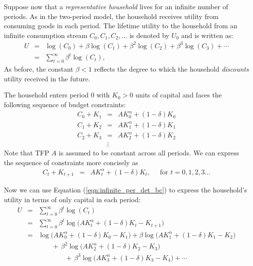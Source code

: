 \documentclass[12pt,fleqn]{article}
\newcommand{\EE}{\begin{eqnarray}}
\newcommand{\FF}{\end{eqnarray}}
\begin{document}
Suppose now that a \emph{representative household} lives for an infinite number of periods. As in the two-period model, the household receives utility from consuming goods in each period. The lifetime utility to the household from an infinite consumption stream $C_0, C_1, C_2, \ldots$ is denoted by $U_0$ and is written as:
	\EE
	U & = & \log (C_0) + \beta  \log (C_1) + \beta^2 \log (C_2)  + \beta^3 \log (C_3)+ \cdots\\
	& = & \sum_{t = 0}^{\infty} \beta^t \log (C_t),  \label{eqn:infinite_per_det_utility}
	\FF
As before, the constant $\beta<1$ reflects the degree to which the household \emph{discounts} utility received in the future.
	
The household enters period 0 with $K_0>0$ units of capital and faces the following sequence of budget constraints:
\EE
C_0 + K_1 & = & A K_0^{\alpha}  + (1-\delta)K_0 \\
C_1 + K_2 & = & A K_1^{\alpha}  + (1-\delta)K_1 \\
C_2 + K_3 & = & A K_2^{\alpha}  + (1-\delta)K_2 \\
& \vdots & 
\FF
Note that TFP $A$ is assumed to be constant across all periods. We can express the sequence of constraints more concisely as 
\EE
C_t + K_{t+1} & = & A K_{t}^{\alpha}  + (1-\delta)K_t, \; \; \; \; \; \text{for } t = 0,1,2,3\ldots \label{eqn:infinite_per_det_bc}
\FF

Now we can use Equation (\ref{eqn:infinite_per_det_bc}) to express the household's utility in terms of only capital in each period:
	\EE
	U 	& = & \sum_{t = 0}^{\infty} \beta^t \log (C_t) \\
		& = & \sum_{t = 0}^{\infty} \beta^t \log \Big(A K_{t}^{\alpha}  + (1-\delta)K_t - K_{t+1}\Big) \\
		& = & \log \Big(A K_{0}^{\alpha}  + (1-\delta)K_0 - K_{1}\Big) + \beta \log \Big(A K_{1}^{\alpha}  + (1-\delta)K_1 - K_{2}\Big) \nonumber\\
		& & \; \; \; \; \; \; \; + \, \beta^2 \log \Big(A K_{2}^{\alpha}  + (1-\delta)K_2 - K_{3}\Big) \nonumber\\
		& & \; \; \; \; \; \; \; \; \; \; \; \; \; \; + \, \beta^3 \log \Big(A K_{3}^{\alpha}  + (1-\delta)K_3 - K_{4}\Big) + \cdots \label{eqn:infinite_per_det_utility_subs}
	\FF
\end{document}
